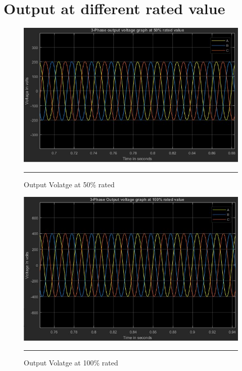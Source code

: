 \section{Output at different rated value}
\begin{figure}[htbp]
	\centering
	\includegraphics[width = 6in]{./Figures/50.JPG}
	\rule{35em}{1pt}
	\caption{Output Volatge at 50\% rated}
\end{figure}
\begin{figure}[htbp]
	\centering
	\includegraphics[width = 6in]{./Figures/100.JPG}
	\rule{35em}{1pt}
	\caption{Output Volatge at 100\% rated}
\end{figure}
